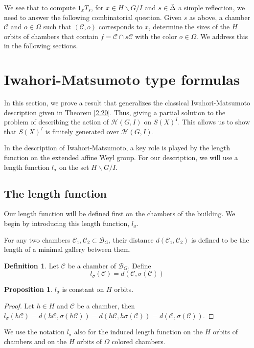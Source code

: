 \documentclass[12pt]{article}
\newcommand{\B}{\mathcal{B}}
\newcommand{\C}{\mathcal{C}}
\newcommand{\<}{\langle}
\renewcommand{\>}{\rangle}
\theoremstyle{plain}
\theoremstyle{definition}
\newtheorem{prop}[theorem]{Proposition}
\newtheorem{defn}[theorem]{Definition} %
\begin{document}
We see that to compute 
$1_xT_s$, for  $x\in  H\backslash G/I$ and $s\in \Tilde{\Delta}$ a simple reflection, we need to answer the following combinatorial question. Given $s$ as above, a chamber $\C$ and $o\in \Omega$ such that $(\C,o)$ corresponds to $x$, determine the sizes of the $H$ orbits of chambers that contain $f=\C\cap s\C$ with the color $o\in\Omega$. We address this in the following sections.



\section{Iwahori-Matsumoto type formulas}

 In this section, we prove a result
that generalizes the classical Iwahori-Matsumoto description given in Theorem \ref{2.20}. Thus, giving a partial solution to the problem of describing the action of $\mathcal{H}(G,I)$ on $S(X)^I$. This allows us to show that $S(X)^I$ is finitely generated over $\mathcal{H}(G,I)$. 

In the description of Iwahori-Matsumoto, a key role is played by the length function on the extended affine Weyl group. For our description, we will use a length function $l_{\sigma}$ on the set $H \backslash G/I.$ 


\subsection{The length function}
Our length function will be defined first on the chambers of the building. We begin by introducing this length function, $l_{\sigma}$.


For any two chambers $\C_1,\C_2\subset \B_{G}$, their distance $d(\C_1,\C_2)$ is defined to be the length of a minimal gallery between them.

\begin{defn}\label{l_sigma}
Let $\C$ be a chamber of $\B_{G}.$  Define $$l_\sigma(\C)=d(\C,\sigma(\C))$$ 
\end{defn}
\begin{prop}
$l_\sigma$ is constant on $H$ orbits.
\end{prop}

\begin{proof}
Let $h\in H$ and $\C$ be a chamber, then $l_\sigma(h\C)=d(h\C,\sigma(h\C))=d(h\C,h\sigma(\C))=d(\C,\sigma(\C))$.
\end{proof}

We use the notation $l_{\sigma}$ also for the induced length function on the $H$ orbits of chambers and on the $H$ orbits of $\Omega$ colored chambers. 
\end{document}
